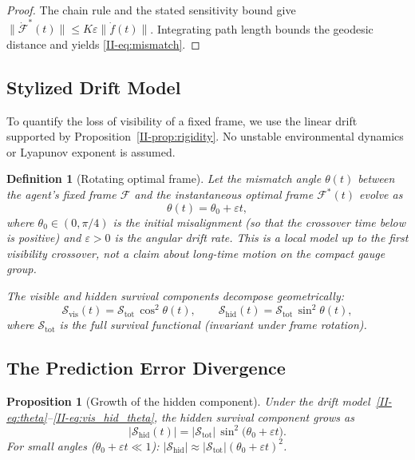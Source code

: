\documentclass[12pt,a4paper,openany]{book}
\newtheorem{proposition}[theorem]{Proposition}
\newtheorem{definition}[theorem]{Definition}
\begin{document}
\begin{proof}
The chain rule and the stated sensitivity bound give
$\lVert\dot{\mathcal F}^*(t)\rVert
\leq K\varepsilon\lVert\dot f(t)\rVert$.
Integrating path length bounds the geodesic distance and yields
\eqref{II-eq:mismatch}.
\end{proof}

\subsection{Stylized Drift Model}
\label{II-subsec:drift_model}

To quantify the loss of visibility of a fixed frame, we use the linear
drift supported by Proposition~\ref{II-prop:rigidity}.  No unstable
environmental dynamics or Lyapunov exponent is assumed.

\begin{definition}[Rotating optimal frame]
\label{II-def:drift}
Let the mismatch angle $\theta(t)$ between the agent's
fixed frame $\mathcal{F}$ and the instantaneous optimal
frame $\mathcal{F}^*(t)$ evolve as
\begin{equation}
\label{II-eq:theta}
\theta(t) = \theta_0+\varepsilon t,
\end{equation}
where $\theta_0 \in (0, \pi/4)$ is the initial misalignment
(so that the crossover time below is positive) and
$\varepsilon>0$ is the angular drift rate.  This is a local model up to
the first visibility crossover, not a claim about long-time motion on
the compact gauge group.

The visible and hidden survival components decompose
geometrically:
\begin{equation}
\label{II-eq:vis_hid_theta}
\mathcal{S}_{\mathrm{vis}}(t)
= \mathcal{S}_{\mathrm{tot}}\,\cos^2\theta(t),
\qquad
\mathcal{S}_{\mathrm{hid}}(t)
= \mathcal{S}_{\mathrm{tot}}\,\sin^2\theta(t),
\end{equation}
where $\mathcal{S}_{\mathrm{tot}}$ is the full survival
functional (invariant under frame rotation).
\end{definition}

\subsection{The Prediction Error Divergence}
\label{II-subsec:divergence}

\begin{proposition}[Growth of the hidden component]
\label{II-prop:divergence}
Under the drift model~\eqref{II-eq:theta}--\eqref{II-eq:vis_hid_theta},
the hidden survival component grows as
\begin{equation}
\label{II-eq:divergence}
\bigl|\mathcal{S}_{\mathrm{hid}}(t)\bigr|
= |\mathcal{S}_{\mathrm{tot}}|\,\sin^2\!\bigl(\theta_0+
  \varepsilon t\bigr).
\end{equation}
For small angles ($\theta_0+\varepsilon t \ll 1$):
$|\mathcal{S}_{\mathrm{hid}}| \approx
|\mathcal{S}_{\mathrm{tot}}|(\theta_0+\varepsilon t)^2$.
\end{proposition}
\end{document}
